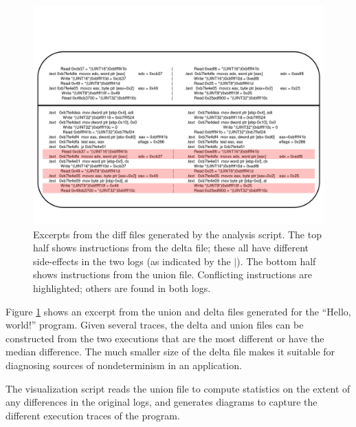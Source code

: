 \begin{figure}[h]
  \center
  \includegraphics[scale=0.50, trim=3cm 1.5cm 3cm 1.5cm]{log2.pdf}
  \caption[Excerpts from the side-by-side diff files generated by the analysis script]%
          {Excerpts from the diff files generated by the analysis script.
            The top half shows instructions from the delta file;
            these all have different side-effects in the two logs
            (as indicated by the $\vert$).
            The bottom half shows instructions from the union file.
            Conflicting instructions are highlighted; others are found in both logs.}
  \label{hw:logsys2}
\end{figure}

\noindent Figure \ref{hw:logsys2} shows an excerpt from the 
union and delta files generated for the ``Hello, world!''
program. Given several traces, the delta and union
files can be constructed from the two
executions that are the most different 
or have the median difference. The 
much smaller size of the delta file
makes it suitable for diagnosing
sources of nondeterminism
in an application. 
\newpage

 \newline
The visualization script reads the union file to 
compute statistics on the extent of any differences in the
original logs, and generates diagrams to 
capture the different execution traces of the program.
 
